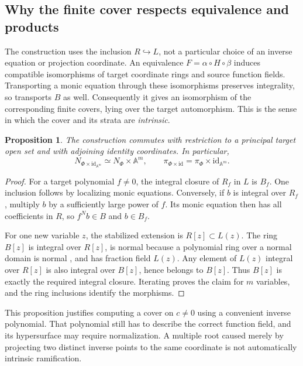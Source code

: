 \documentclass[11pt]{article}
\numberwithin{equation}{section}
\theoremstyle{plain}
\newtheorem{proposition}[theorem]{Proposition}
\theoremstyle{definition}
\theoremstyle{remark}
\newcommand{\A}{\mathbb{A}}
\newcommand{\id}{\mathrm{id}}
\begin{document}
\subsection{Why the finite cover respects equivalence and products}
The construction uses the inclusion $R\hookrightarrow L$, not a particular
choice of an inverse equation or projection coordinate. An equivalence
$F=\alpha\circ H\circ\beta$ induces compatible isomorphisms of target
coordinate rings and source function fields. Transporting a monic equation
through these isomorphisms preserves integrality, so transports $B$ as well.
Consequently it gives an isomorphism of the corresponding finite covers,
lying over the target automorphism. This is the sense in which the cover
and its strata are \emph{intrinsic}.

\begin{proposition}\label{prod:prop:cover-products}
The construction commutes with restriction to a principal target open set
and with adjoining identity coordinates. In particular,
\[
 N_{\Phi\times\id_{\A^m}}\simeq N_\Phi\times\A^m,
 \qquad \pi_{\Phi\times\id}=\pi_\Phi\times\id_{\A^m}.
\]
\end{proposition}
\begin{proof}
For a target polynomial $f\ne0$, the integral closure of $R_f$ in $L$
is $B_f$. One inclusion follows by localizing monic equations. Conversely,
if $b$ is integral over $R_f$, multiply $b$ by a sufficiently large power
of $f$. Its monic equation then has all coefficients in $R$, so
$f^Nb\in B$ and $b\in B_f$.

For one new variable $z$, the stabilized extension is
$R[z]\subset L(z)$. The ring $B[z]$ is integral over $R[z]$, is normal
because a polynomial ring over a normal domain is normal
\cite{StacksNormal}, and has fraction field $L(z)$. Any element of $L(z)$
integral over $R[z]$ is also integral over $B[z]$, hence belongs to $B[z]$.
Thus $B[z]$ is exactly the required integral closure. Iterating proves the
claim for $m$ variables, and the ring inclusions identify the morphisms.
\end{proof}

This proposition justifies computing a cover on $c\ne0$ using a convenient
inverse polynomial. That polynomial still has to describe the correct
function field, and its hypersurface may require normalization. A multiple
root caused merely by projecting two distinct inverse points to the same
coordinate is not automatically intrinsic ramification.
\end{document}
